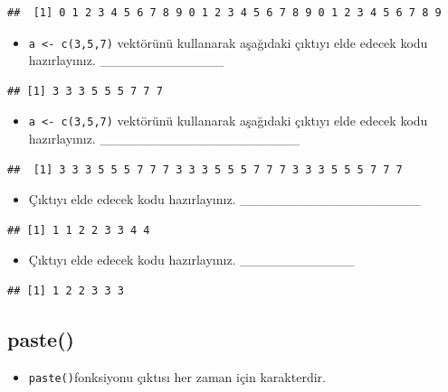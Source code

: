 \documentclass[
  oneside]{book}
\providecommand{\tightlist}{%
  \setlength{\itemsep}{0pt}\setlength{\parskip}{0pt}}
\begin{document}
\begin{verbatim}
##  [1] 0 1 2 3 4 5 6 7 8 9 0 1 2 3 4 5 6 7 8 9 0 1 2 3 4 5 6 7 8 9
\end{verbatim}

\begin{itemize}
\tightlist
\item
  \texttt{a\ \textless{}-\ c(3,5,7)} vektörünü kullanarak aşağıdaki çıktıyı elde edecek kodu hazırlayınız. \_\_\_\_\_\_\_\_\_\_\_\_\_
\end{itemize}

\begin{verbatim}
## [1] 3 3 3 5 5 5 7 7 7
\end{verbatim}

\begin{itemize}
\tightlist
\item
  \texttt{a\ \textless{}-\ c(3,5,7)} vektörünü kullanarak aşağıdaki çıktıyı elde edecek kodu hazırlayınız. \_\_\_\_\_\_\_\_\_\_\_\_\_\_\_\_\_\_\_\_\_
\end{itemize}

\begin{verbatim}
##  [1] 3 3 3 5 5 5 7 7 7 3 3 3 5 5 5 7 7 7 3 3 3 5 5 5 7 7 7
\end{verbatim}

\begin{itemize}
\tightlist
\item
  Çıktıyı elde edecek kodu hazırlayınız. \_\_\_\_\_\_\_\_\_\_\_\_\_\_\_\_\_\_\_
\end{itemize}

\begin{verbatim}
## [1] 1 1 2 2 3 3 4 4
\end{verbatim}

\begin{itemize}
\tightlist
\item
  Çıktıyı elde edecek kodu hazırlayınız. \_\_\_\_\_\_\_\_\_\_\_\_
\end{itemize}

\begin{verbatim}
## [1] 1 2 2 3 3 3
\end{verbatim}

\hypertarget{paste}{%
\subsection{paste()}\label{paste}}

\begin{itemize}
\tightlist
\item
  \texttt{paste()}fonksiyonu çıktısı her zaman için karakterdir.
\end{itemize}
\end{document}
